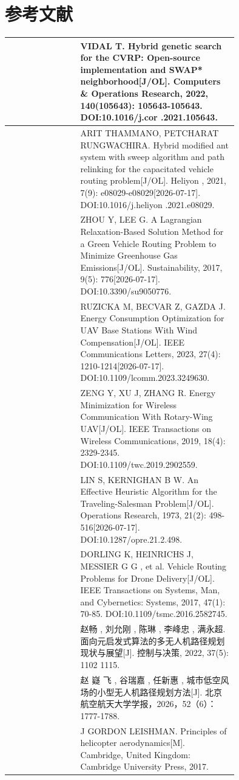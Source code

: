 \documentclass[UTF8,fontset=windows,12pt,a4paper]{ctexart}
\begin{document}
\section*{参考文献}
\begin{center}\small
\begin{longtable}{p{0.22\linewidth}p{0.22\linewidth}}
\toprule
[1] & VIDAL T. Hybrid genetic search for the CVRP: Open-source implementation and SWAP* neighborhood[J/OL]. Computers \& Operations Research, 2022, 140(105643): 105643-105643. DOI:10.1016/j.cor .2021.105643. \\
\midrule
[2] & ARIT THAMMANO, PETCHARAT RUNGWACHIRA. Hybrid modified ant system with sweep algorithm and path relinking for the capacitated vehicle routing problem[J/OL]. Heliyon , 2021, 7(9): e08029-e08029[2026-07-17]. DOI:10.1016/j.heliyon .2021.e08029. \\
[3] & ZHOU Y, LEE G. A Lagrangian Relaxation-Based Solution Method for a Green Vehicle Routing Problem to Minimize Greenhouse Gas Emissions[J/OL]. Sustainability, 2017, 9(5): 776[2026-07-17]. DOI:10.3390/su9050776. \\
[4] & RUZICKA M, BECVAR Z, GAZDA J. Energy Consumption Optimization for UAV Base Stations With Wind Compensation[J/OL]. IEEE Communications Letters, 2023, 27(4): 1210-1214[2026-07-17]. DOI:10.1109/lcomm.2023.3249630. \\
[5] & ZENG Y, XU J, ZHANG R. Energy Minimization for Wireless Communication With Rotary-Wing UAV[J/OL]. IEEE Transactions on Wireless Communications, 2019, 18(4): 2329-2345. DOI:10.1109/twc.2019.2902559. \\
[6] & LIN S, KERNIGHAN B W. An Effective Heuristic Algorithm for the Traveling-Salesman Problem[J/OL]. Operations Research, 1973, 21(2): 498-516[2026-07-17]. DOI:10.1287/opre.21.2.498. \\
[7] & DORLING K, HEINRICHS J, MESSIER G G , et al. Vehicle Routing Problems for Drone Delivery[J/OL]. IEEE Transactions on Systems, Man, and Cybernetics: Systems, 2017, 47(1): 70-85. DOI:10.1109/tsmc.2016.2582745. \\
[8] & 赵畅 , 刘允刚 , 陈琳 , 李峰忠 , 满永超.面向元启发式算法的多无人机路径规划现状与展望[J]. 控制与决策, 2022, 37(5): 1102 1115. \\
[9] & 赵 嶷 飞 , 谷瑞嘉 , 任新惠 , 城市低空风场的小型无人机路径规划方法[J]. 北京航空航天大学学报，2026，52（6）：1777-1788. \\
[10] & J GORDON LEISHMAN. Principles of helicopter aerodynamics[M]. Cambridge, United Kingdom: Cambridge University Press, 2017. \\
\bottomrule
\end{longtable}
\end{center}
\end{document}
